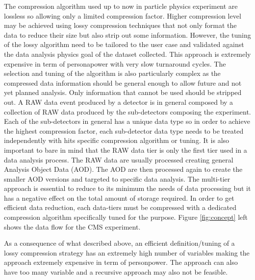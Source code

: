 The compression algorithm used up to now in particle physics experiment are lossless so allowing only a limited compression factor. Higher compression level may be achieved using lossy compression techniques that not only format the data to reduce their size but also strip out some information. However, the tuning of the lossy algorithm need to be tailored to the user case and validated against the data analysis physics goal of the dataset collected. This approach is extremely expensive in term of personapower with very slow turnaround cycles. The selection and tuning of the algorithm is also particularly complex as the compressed data information should be general enough to allow future and not yet planned analysis. Only information that cannot be used should be stripped out.
 A RAW data event produced by a detector is in general composed by a collection of RAW data produced by the sub-detectors composing the experiment. Each of the sub-detectors in general has a unique data type so in order to achieve the highest compression factor, each sub-detector data type needs to be treated independently with hits specific compression algorithm or tuning. It is also important to bare in mind that the RAW data tier is only the first tier used in a data analysis process. The RAW data are usually processed creating general Analysis Object Data (AOD). The AOD are then processed again to create the smaller AOD versions and targeted to specific data analysis. The multi-tier approach is essential to reduce to its minimum the needs of data processing but it has a negative effect on the total amount of storage required. In order to get efficient data reduction, each data-tiers must be compressed with a dedicated compression algorithm specifically tuned for the purpose. Figure \ref{fig:concept} left shows the data flow for the CMS experiment. 
 
 As a consequence of what described above, an efficient definition/tuning of a lossy compression strategy has an extremely high number of variables making the approach extremely expensive in term of personpower. The approach can also have too many variable and a recursive approach may also not be feasible. 

